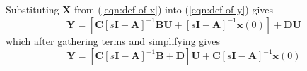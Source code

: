 Substituting $\mathbf{X}$ from (\ref{eqn:def-of-x}) into
(\ref{eqn:def-of-y}) gives
\begin{equation}\label{eqn:def-of-y2}
  \mathbf{Y}=\left[\mathbf{C}\left[s\mathbf{I}-\mathbf{A}\right]^{-1}\mathbf{B}\mathbf{U}+
  \left[s\mathbf{I}-\mathbf{A}\right]^{-1}\mathbf{x}(0)\right]+\mathbf{D}\mathbf{U}\nonumber
\end{equation}
which after gathering terms and simplifying gives
\begin{equation}\label{eqn:def-of-y3}
  \mathbf{Y}=\left[\mathbf{C}\left[s\mathbf{I}-\mathbf{A}\right]^{-1}\mathbf{B}+\mathbf{D}\right]\mathbf{U}
      +\mathbf{C}
  \left[s\mathbf{I}-\mathbf{A}\right]^{-1}\mathbf{x}(0)
  \end{equation}

\endinput

